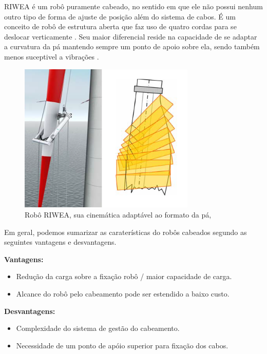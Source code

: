 RIWEA é um robô puramente cabeado, no sentido em que ele não possui nenhum
outro tipo de forma de ajuste de posição além do sistema de cabos. É um
conceito de robô de estrutura aberta que faz uso de quatro cordas para se
deslocar verticamente \citep{jeon2012maintenance}. Seu maior diferencial reside
na capacidade de se adaptar a curvatura da pá mantendo sempre um ponto de apoio
sobre ela, sendo também menos suceptivel a vibrações \citep{riwea}.

\begin{figure}[!h]
	\centering
	\includegraphics[width=8.4cm]{figs/cables/riwea}
	\caption{Robô RIWEA, sua cinemática adaptável ao formato da pá, \cite{riwea}}
	\label{fig:cables:riwea}
\end{figure}

Em geral, podemos sumarizar as caraterísticas do robôs cabeados segundo as
seguintes vantagens e desvantagens.

\textbf{Vantagens:}
\begin{itemize}
  \item Redução da carga sobre a fixação robô / maior capacidade de carga.
  \item Alcance do robô pelo cabeamento pode ser estendido a baixo custo.  
\end{itemize}

\textbf{Desvantagens:}
\begin{itemize}
  \item Complexidade do sistema de gestão do cabeamento.
  \item Necessidade de um ponto de apóio superior para fixação dos cabos.
\end{itemize}


